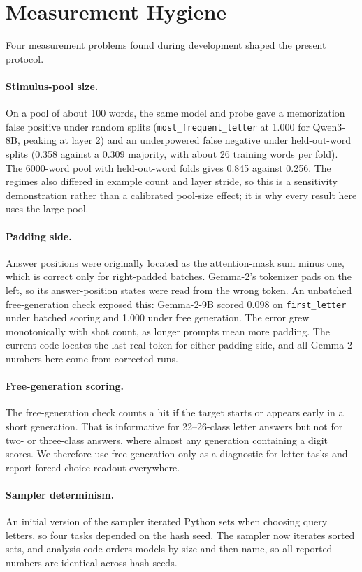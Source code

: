 \section{Measurement Hygiene}
\label{app:hygiene}

Four measurement problems found during development shaped the present protocol.

\paragraph{Stimulus-pool size.}
On a pool of about 100 words, the same model and probe gave a memorization false positive under
random splits (\texttt{most\_frequent\_letter} at 1.000 for Qwen3-8B, peaking at layer 2) and an
underpowered false negative under held-out-word splits (0.358 against a 0.309 majority, with about 26
training words per fold). The 6000-word pool with held-out-word folds gives 0.845 against 0.256. The
regimes also differed in example count and layer stride, so this is a sensitivity demonstration
rather than a calibrated pool-size effect; it is why every result here uses the large pool.

\paragraph{Padding side.}
Answer positions were originally located as the attention-mask sum minus one, which is correct only
for right-padded batches. Gemma-2's tokenizer pads on the left, so its answer-position states were
read from the wrong token. An unbatched free-generation check exposed this: Gemma-2-9B scored 0.098
on \texttt{first\_letter} under batched scoring and 1.000 under free generation. The error grew
monotonically with shot count, as longer prompts mean more padding. The current code locates the last
real token for either padding side, and all Gemma-2 numbers here come from corrected runs.

\paragraph{Free-generation scoring.}
The free-generation check counts a hit if the target starts or appears early in a short generation.
That is informative for 22--26-class letter answers but not for two- or three-class answers, where
almost any generation containing a digit scores. We therefore use free generation only as a
diagnostic for letter tasks and report forced-choice readout everywhere.

\paragraph{Sampler determinism.}
An initial version of the sampler iterated Python sets when choosing query letters, so four tasks depended on the
hash seed. The sampler now iterates sorted sets, and analysis code orders models by size and then
name, so all reported numbers are identical across hash seeds.

